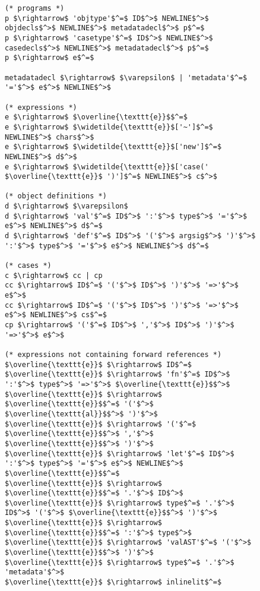 
\begin{figure}
\begin{lstlisting}[mathescape]
(* programs *)
p $\rightarrow$ 'objtype'$^=$ ID$^>$ NEWLINE$^>$ objdecls$^>$ NEWLINE$^>$ metadatadecl$^>$ p$^=$
p $\rightarrow$ 'casetype'$^=$ ID$^>$ NEWLINE$^>$ casedecls$^>$ NEWLINE$^>$ metadatadecl$^>$ p$^=$
p $\rightarrow$ e$^=$

metadatadecl $\rightarrow$ $\varepsilon$ | 'metadata'$^=$ '='$^>$ e$^>$ NEWLINE$^>$

(* expressions *)
e $\rightarrow$ $\overline{\texttt{e}}$$^=$
e $\rightarrow$ $\widetilde{\texttt{e}}$['~']$^=$ NEWLINE$^>$ chars$^>$
e $\rightarrow$ $\widetilde{\texttt{e}}$['new']$^=$ NEWLINE$^>$ d$^>$
e $\rightarrow$ $\widetilde{\texttt{e}}$['case(' $\overline{\texttt{e}}$ ')']$^=$ NEWLINE$^>$ c$^>$

(* object definitions *)
d $\rightarrow$ $\varepsilon$
d $\rightarrow$ 'val'$^=$ ID$^>$ ':'$^>$ type$^>$ '='$^>$ e$^>$ NEWLINE$^>$ d$^=$
d $\rightarrow$ 'def'$^=$ ID$^>$ '('$^>$ argsig$^>$ ')'$^>$ ':'$^>$ type$^>$ '='$^>$ e$^>$ NEWLINE$^>$ d$^=$

(* cases *)
c $\rightarrow$ cc | cp
cc $\rightarrow$ ID$^=$ '('$^>$ ID$^>$ ')'$^>$ '=>'$^>$ e$^>$
cc $\rightarrow$ ID$^=$ '('$^>$ ID$^>$ ')'$^>$ '=>'$^>$ e$^>$ NEWLINE$^>$ cs$^=$
cp $\rightarrow$ '('$^=$ ID$^>$ ','$^>$ ID$^>$ ')'$^>$ '=>'$^>$ e$^>$

(* expressions not containing forward references *)
$\overline{\texttt{e}}$ $\rightarrow$ ID$^=$
$\overline{\texttt{e}}$ $\rightarrow$ 'fn'$^=$ ID$^>$ ':'$^>$ type$^>$ '=>'$^>$ $\overline{\texttt{e}}$$^>$
$\overline{\texttt{e}}$ $\rightarrow$ $\overline{\texttt{e}}$$^=$ '('$^>$ $\overline{\texttt{al}}$$^>$ ')'$^>$
$\overline{\texttt{e}}$ $\rightarrow$ '('$^=$ $\overline{\texttt{e}}$$^>$ ','$^>$ $\overline{\texttt{e}}$$^>$ ')'$^>$
$\overline{\texttt{e}}$ $\rightarrow$ 'let'$^=$ ID$^>$ ':'$^>$ type$^>$ '='$^>$ e$^>$ NEWLINE$^>$ $\overline{\texttt{e}}$$^=$
$\overline{\texttt{e}}$ $\rightarrow$ $\overline{\texttt{e}}$$^=$ '.'$^>$ ID$^>$
$\overline{\texttt{e}}$ $\rightarrow$ type$^=$ '.'$^>$ ID$^>$ '('$^>$ $\overline{\texttt{e}}$$^>$ ')'$^>$
$\overline{\texttt{e}}$ $\rightarrow$ $\overline{\texttt{e}}$$^=$ ':'$^>$ type$^>$
$\overline{\texttt{e}}$ $\rightarrow$ 'valAST'$^=$ '('$^>$ $\overline{\texttt{e}}$$^>$ ')'$^>$
$\overline{\texttt{e}}$ $\rightarrow$ type$^=$ '.'$^>$ 'metadata'$^>$
$\overline{\texttt{e}}$ $\rightarrow$ inlinelit$^=$


\end{lstlisting}
\end{figure}
